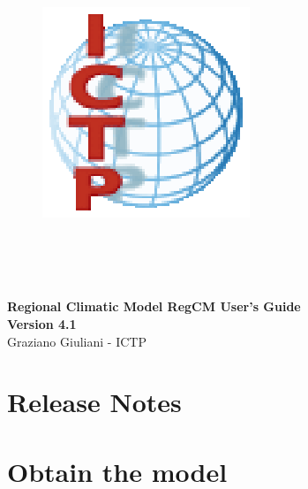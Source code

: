 \documentclass[10pt,twoside,a4paper]{report}
\begin{document}
\begin{titlepage}

\begin{figure}
\vspace{-35pt}
\begin{center}
\includegraphics{ICTP_logo}
\end{center}
\end{figure}

\\
 \\
 \\

\vspace{3cm}

\begin{center}
{\Large
  {\bf Regional Climatic Model RegCM User's Guide} \\
  {\bf Version 4.1} \\
  \vspace{2cm}
  Graziano Giuliani  - ICTP
}
\end{center}

\end{titlepage}

\cleardoublepage

\tableofcontents

\cleardoublepage

\chapter{Release Notes}


\chapter{Obtain the model}

\end{document}
